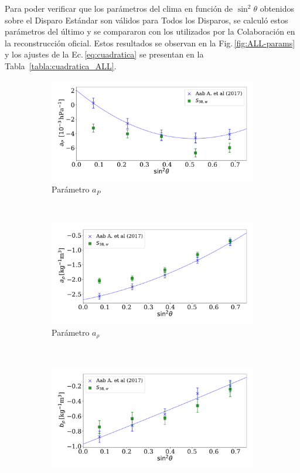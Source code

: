 Para poder verificar que los parámetros del clima en función de $\sin^2\theta$ obtenidos sobre el Disparo Estándar son válidos para Todos los Disparos, se calculó estos parámetros del último y se compararon con los utilizados por la Colaboración en la reconstrucción oficial. Estos resultados se observan en la Fig.\,\ref{fig:ALL-params} y los ajustes de la Ec.\,\ref{eq:cuadratica} se presentan en la Tabla~\ref{tabla:cuadratica_ALL}.   

\begin{figure}[H]
  \centering
  \begin{subfigure}[b]{0.75\textwidth}
  \includegraphics[width=\linewidth]{Graphs/params/ap_AllTriggers.pdf}
  \caption{Parámetro $a_P$ }
  \end{subfigure}\\
  \begin{subfigure}[b]{0.75\textwidth}
  \includegraphics[width=\linewidth]{Graphs/params/arho_AllTriggers.pdf}
  \caption{Parámetro $a_{\rho}$ }
  \end{subfigure}\\
  \begin{subfigure}[b]{\textwidth}
  \centering
  \includegraphics[width=0.75\linewidth]{Graphs/params/brho_AllTriggers.pdf}

\end{subfigure}
\end{figure}
